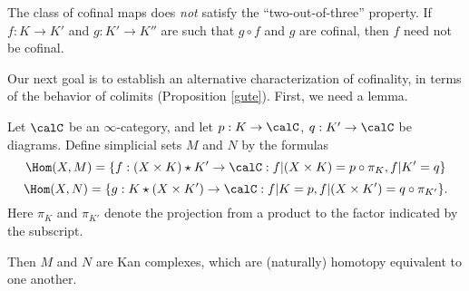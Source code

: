 \begin{warning}
The class of cofinal maps does {\em not} satisfy the
``two-out-of-three'' property. If $f: K \rightarrow K'$ and $g: K'
\rightarrow K''$ are such that $g \circ f$ and $g$ are cofinal,
then $f$ need not be cofinal.
\end{warning}

Our next goal is to establish an alternative characterization of cofinality, in terms of the behavior of colimits (Proposition \ref{gute}). First, we need a lemma.

\begin{lemma}\label{cogh}
Let $\calC$ be an $\infty$-category, and let $p: K \rightarrow \calC$, $q: K'
\rightarrow \calC$ be diagrams. Define simplicial sets $M$ and $N$ by the
formulas
$$ \Hom(X,M) = \{ f: (X \times K) \star K' \rightarrow \calC :
f|(X \times K) = p \circ \pi_{K}, f|K' = q \}$$
$$ \Hom(X,N) = \{ g: K \star (X \times K') \rightarrow \calC :
f|K = p, f|(X \times K') = q \circ \pi_{K'} \}. $$ Here $\pi_K$
and $\pi_{K'}$ denote the projection from a product to the factor
indicated by the subscript.

Then $M$ and $N$ are Kan complexes, which are (naturally) homotopy
equivalent to one another.
\end{lemma}

